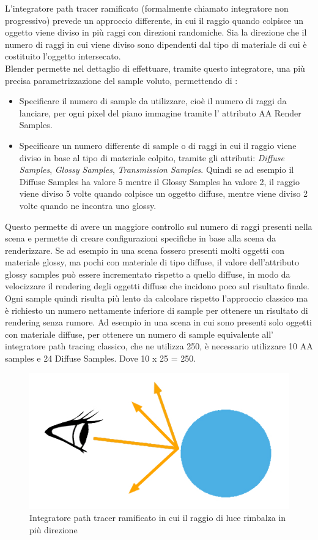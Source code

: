 L’integratore path tracer ramificato (formalmente chiamato integratore non progressivo) prevede un approccio differente, in cui il raggio quando colpisce un oggetto  viene diviso in più raggi con direzioni randomiche. Sia la direzione che il numero di raggi in cui viene diviso sono dipendenti dal tipo di materiale di cui è costituito l’oggetto intersecato.
\\
Blender permette nel dettaglio di effettuare, tramite questo integratore, una più precisa parametrizzazione del sample voluto, permettendo di :
\begin{itemize}
\item Specificare il numero di sample da utilizzare, cioè il numero di raggi da lanciare, per ogni pixel del piano immagine tramite l’ attributo AA Render Samples.
\item Specificare un numero differente di sample o di raggi in cui il raggio viene diviso in base al tipo di materiale colpito, tramite gli attributi: \emph{Diffuse Samples}, \emph{Glossy Samples}, \emph{Transmission Samples}. Quindi se ad esempio il Diffuse Samples ha valore 5 mentre il Glossy Samples ha valore 2, il raggio viene diviso 5 volte quando colpisce un oggetto diffuse, mentre viene diviso 2 volte quando ne incontra uno glossy.
\end{itemize}
Questo permette di avere un maggiore controllo sul numero di raggi presenti nella scena e permette di creare configurazioni specifiche in base alla scena da renderizzare.
Se ad esempio in una scena fossero presenti molti oggetti con materiale glossy, ma pochi con materiale di tipo diffuse, il valore dell’attributo glossy samples può essere incrementato rispetto a quello diffuse, in modo da velocizzare il rendering degli oggetti diffuse che incidono poco sul risultato finale.
\\
Ogni sample quindi risulta più lento da calcolare rispetto l’approccio classico ma è richiesto un numero nettamente inferiore di sample per ottenere un risultato di rendering senza rumore.
Ad esempio in una scena in cui sono presenti solo oggetti con materiale diffuse, per ottenere un numero di sample equivalente all’ integratore path tracing classico, che ne utilizza 250, è necessario utilizzare 10 AA samples e 24 Diffuse Samples. Dove 10 x 25 = 250.
\\
\begin{figure}[htb]
 \centering
 \includegraphics[width=0.8\linewidth]{images/chapter_tecnologie_abilitanti/tecnologie_abilitanti_sferaluce2.jpg}\hfill
 \caption[Integratore path tracer ramificato]{Integratore path tracer ramificato in cui il raggio di luce rimbalza in più direzione}
 \label{fig:tecnologie_abilitanti_sferaluce2}
\end{figure}

